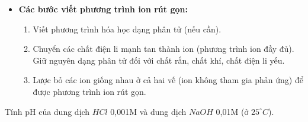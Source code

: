 \begin{phuongphap}
\begin{itemize}
\begin{itemize}
\begin{itemize}
		                \end{itemize}
	            \item \textbf{Các bước viết phương trình ion rút gọn:}
	                \begin{enumerate}
		                    \item Viết phương trình hóa học dạng phân tử (nếu cần).
		                    \item Chuyển các chất điện li mạnh tan thành ion (phương trình ion đầy đủ). Giữ nguyên dạng phân tử đối với chất rắn, chất khí, chất điện li yếu.
		                    \item Lược bỏ các ion giống nhau ở cả hai vế (ion không tham gia phản ứng) để được phương trình ion rút gọn.
		                \end{enumerate}
	        \end{itemize}
\end{itemize}
\end{phuongphap}

\begin{vd}
	Tính pH của dung dịch $HCl$ 0,001M và dung dịch $NaOH$ 0,01M (ở $25^\circ C$).
\end{vd}

